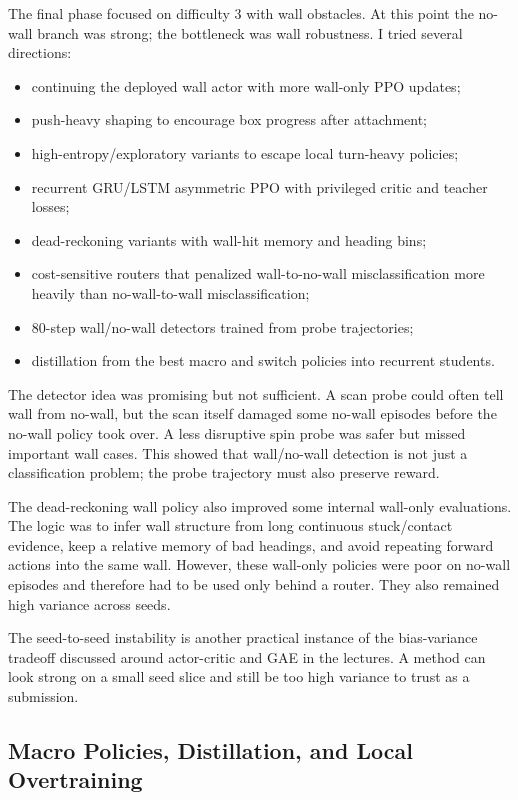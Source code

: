 \documentclass[11pt]{article}
\begin{document}
The final phase focused on difficulty 3 with wall obstacles. At this point the no-wall
branch was strong; the bottleneck was wall robustness. I tried several directions:
\begin{itemize}[leftmargin=1.5em]
  \item continuing the deployed wall actor with more wall-only PPO updates;
  \item push-heavy shaping to encourage box progress after attachment;
  \item high-entropy/exploratory variants to escape local turn-heavy policies;
  \item recurrent GRU/LSTM asymmetric PPO with privileged critic and teacher losses;
  \item dead-reckoning variants with wall-hit memory and heading bins;
  \item cost-sensitive routers that penalized wall-to-no-wall misclassification more
  heavily than no-wall-to-wall misclassification;
  \item 80-step wall/no-wall detectors trained from probe trajectories;
  \item distillation from the best macro and switch policies into recurrent students.
\end{itemize}

The detector idea was promising but not sufficient. A scan probe could often tell wall
from no-wall, but the scan itself damaged some no-wall episodes before the no-wall
policy took over. A less disruptive spin probe was safer but missed important wall
cases. This showed that wall/no-wall detection is not just a classification problem; the
probe trajectory must also preserve reward.

The dead-reckoning wall policy also improved some internal wall-only evaluations. The
logic was to infer wall structure from long continuous stuck/contact evidence, keep a
relative memory of bad headings, and avoid repeating forward actions into the same
wall. However, these wall-only policies were poor on no-wall episodes and therefore had
to be used only behind a router. They also remained high variance across seeds.

The seed-to-seed instability is another practical instance of the bias-variance tradeoff
discussed around actor-critic and GAE in the lectures. A method can look strong on a
small seed slice and still be too high variance to trust as a submission.

\subsection{Macro Policies, Distillation, and Local Overtraining}
\end{document}
